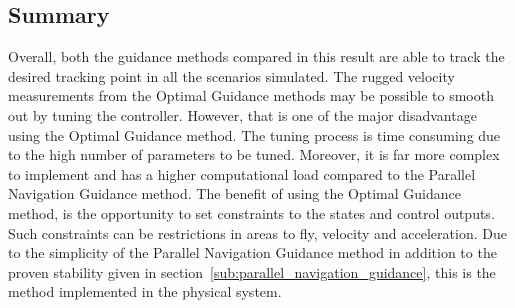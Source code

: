 \subsection{Summary} %
\label{sub:guidance_summary}
Overall, both the guidance methods compared in this result are able to track the desired tracking point in all the scenarios simulated. The rugged velocity measurements from the Optimal Guidance methods may be possible to smooth out by tuning the controller. However, that is one of the major disadvantage using the Optimal Guidance method. The tuning process is time consuming due to the high number of parameters to be tuned. Moreover, it is far more complex to implement and has a higher computational load compared to the Parallel Navigation Guidance method. The benefit of using the Optimal Guidance method, is the opportunity to set constraints to the states and control outputs. Such constraints can be restrictions in areas to fly, velocity and acceleration. Due to the simplicity of the Parallel Navigation Guidance method in addition to the proven stability given in section~\ref{sub:parallel_navigation_guidance}, this is the method implemented in the physical system.

